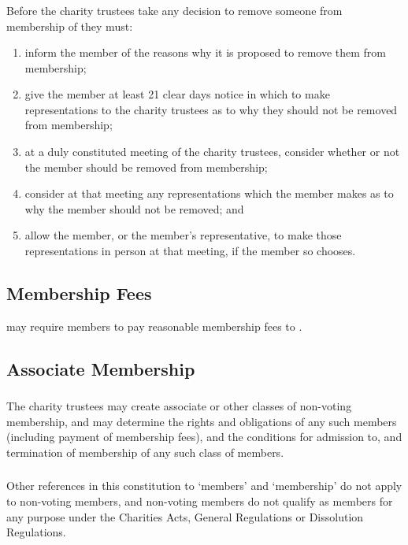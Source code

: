         \subsubsection{}
        Before the charity trustees take any decision to remove someone from membership of \shortname{} they must:
        \begin{enumerate}
            \item inform the member of the reasons why it is proposed to remove them from membership;
            \item give the member at least 21 clear days notice in which to make representations to the charity trustees as to why they should not be removed from membership;
            \item at a duly constituted meeting of the charity trustees, consider whether or not the member should be removed from membership;
            \item consider at that meeting any representations which the member makes as to why the member should not be removed; and
            \item allow the member, or the member's representative, to make those representations in person at that meeting, if the member so chooses.
        \end{enumerate}

    \subsection{Membership Fees}\label{sec:fees}
    \shortname{} may require members to pay reasonable membership fees to \shortname{}.

    \subsection{Associate Membership}\label{sec:associate}

        \subsubsection{}
        The charity trustees may create associate or other classes of non-voting membership, and may determine the rights and obligations of any such members (including payment of membership fees), and the conditions for admission to, and termination of membership of any such class of members.

        \subsubsection{}
        Other references in this constitution to `members' and `membership' do not apply to non-voting members, and non-voting members do not qualify as members for any purpose under the Charities Acts, General Regulations or Dissolution Regulations.
